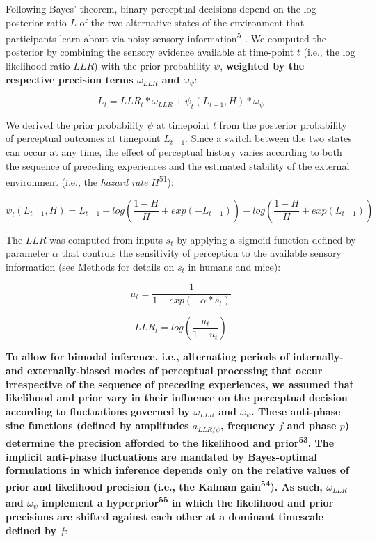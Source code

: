 \documentclass[
]{article}
\begin{document}
Following Bayes' theorem, binary perceptual decisions depend on the log
posterior ratio \(L\) of the two alternative states of the environment
that participants learn about via noisy sensory
information\textsuperscript{51}. We computed the posterior by combining
the sensory evidence available at time-point \(t\) (i.e., the log
likelihood ratio \(LLR\)) with the prior probability \(\psi\),
\textbf{weighted by the respective precision terms \(\omega_{LLR}\) and
\(\omega_{\psi}\)}:

\begin{equation}
L_t = LLR_t * \omega_{LLR} + \psi_t(L_{t-1}, H) * \omega_{\psi}
\end{equation}

We derived the prior probability \(\psi\) at timepoint \(t\) from the
posterior probability of perceptual outcomes at timepoint \(L_{t-1}\).
Since a switch between the two states can occur at any time, the effect
of perceptual history varies according to both the sequence of preceding
experiences and the estimated stability of the external environment
(i.e., the \emph{hazard rate} \(H\)\textsuperscript{51}):

\begin{equation}
\psi_t(L_{t-1}, H)  = L_{t-1} + log(\frac{1-H}{H} + exp(-L_{t-1})) - log(\frac{1-H}{H} + exp(L_{t-1}))
\end{equation}

The \(LLR\) was computed from inputs \(s_t\) by applying a sigmoid
function defined by parameter \(\alpha\) that controls the sensitivity
of perception to the available sensory information (see Methods for
details on \(s_t\) in humans and mice):

\begin{equation}
u_t = \frac{1}{1 + exp(-\alpha * s_t)}
\end{equation}

\begin{equation}
LLR_t = log(\frac{u_t}{1-u_t})
\end{equation}

\textbf{To allow for bimodal inference, i.e., alternating periods of
internally- and externally-biased modes of perceptual processing that
occur irrespective of the sequence of preceding experiences, we assumed
that likelihood and prior vary in their influence on the perceptual
decision according to fluctuations governed by \(\omega_{LLR}\) and
\(\omega_{\psi}\). These anti-phase sine functions (defined by
amplitudes \(a_{LLR/\psi}\), frequency \(f\) and phase \(p\)) determine
the precision afforded to the likelihood and prior\textsuperscript{53}.
The implicit anti-phase fluctuations are mandated by Bayes-optimal
formulations in which inference depends only on the relative values of
prior and likelihood precision (i.e., the Kalman
gain\textsuperscript{54}). As such, \(\omega_{LLR}\) and
\(\omega_{\psi}\) implement a hyperprior\textsuperscript{55} in which
the likelihood and prior precisions are shifted against each other at a
dominant timescale defined by \(f\)}:
\end{document}
